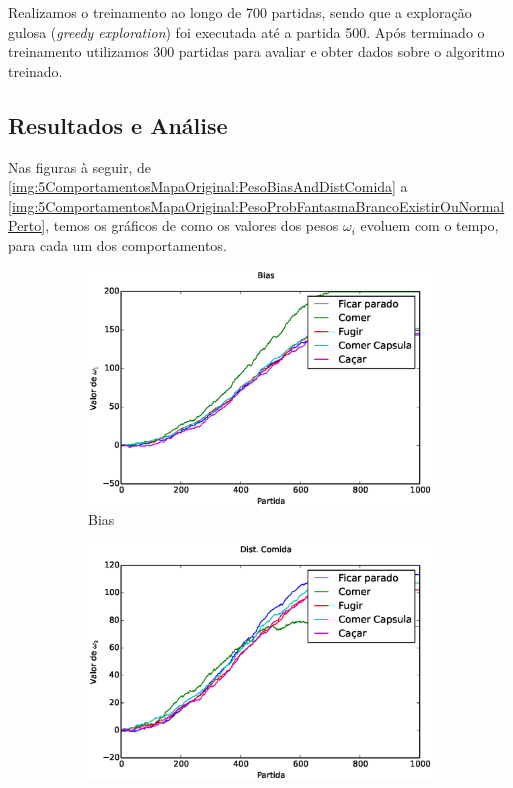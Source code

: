 Realizamos o treinamento ao longo de 700 partidas, sendo que a exploração gulosa (\textit{greedy exploration}) foi executada até a partida 500. Após terminado o treinamento utilizamos 300 partidas para avaliar e obter dados sobre o algoritmo treinado.


\subsection{Resultados e Análise}

Nas figuras à seguir, de \ref{img:5ComportamentosMapaOriginal:PesoBiasAndDistComida} a \ref{img:5ComportamentosMapaOriginal:PesoProbFantasmaBrancoExistirOuNormalPerto}, temos os gráficos de como os valores dos pesos $ \omega_i $ evoluem com o tempo, para cada um dos comportamentos.

\begin{figure}[H]
	\centering
	\begin{subfigure}[t]{.5\textwidth}
		\centering
		\includegraphics[width=\linewidth]{images/5_behaviors_original_map/weights____pol__Bias}
		\caption{Bias}
		\label{img:5ComportamentosMapaOriginal:PesoBias}
	\end{subfigure}%
	\begin{subfigure}[t]{.5\textwidth}
		\centering
		\includegraphics[width=\linewidth]{images/5_behaviors_original_map/weights____pol__DistComida}

\end{subfigure}
\end{figure}
